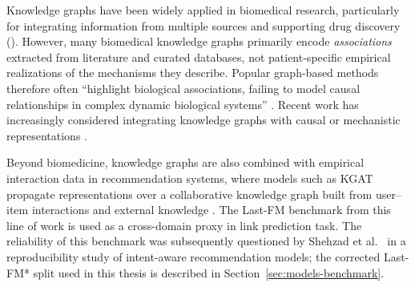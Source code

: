 Knowledge graphs have been widely applied in biomedical research,
particularly for integrating information from multiple sources and
supporting drug discovery (\textcite{maclean2021knowledge}).
However, many biomedical knowledge graphs primarily encode \emph{associations}
extracted from literature and curated databases, not
patient-specific empirical realizations of the mechanisms they describe.
Popular graph-based methods therefore often ``highlight biological
associations, failing to model causal relationships in complex dynamic
biological systems'' \cite{maclean2021knowledge}.
Recent work has increasingly considered integrating knowledge graphs with
causal or mechanistic representations
\cite{toonsi2025causal,lyu2023causal,mesinovic2026causalgnn}.

Beyond biomedicine, knowledge graphs are also combined with empirical
interaction data in recommendation systems, where models such as KGAT
propagate representations over a collaborative knowledge graph built from
user--item interactions and external knowledge \cite{wang2019kgat}.
The Last-FM benchmark from this line of work is used as a cross-domain
proxy in link prediction task.
The reliability of this benchmark was subsequently questioned by
Shehzad et al.\ \cite{shehzad2025reproducibility} in a reproducibility
study of intent-aware recommendation models; the corrected Last-FM* split
used in this thesis is described in Section~\ref{sec:models-benchmark}.

